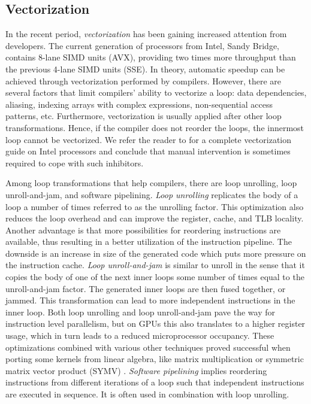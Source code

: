\subsection{Vectorization}

In the recent period, \textit{vectorization} has been gaining increased
attention from developers. The current generation of processors from Intel,
Sandy Bridge, contains 8-lane SIMD units (AVX), providing two times more
throughput than the previous 4-lane SIMD units (SSE). In theory, automatic
speedup can be achieved through vectorization performed by compilers. However,
there are several factors that limit compilers' ability to vectorize a loop: 
data dependencies, aliasing, indexing arrays with complex expressions,
non-sequential access patterns, etc. Furthermore, vectorization is usually
applied after other loop transformations. Hence, if the compiler does not
reorder the loops, the innermost loop cannot be vectorized. We refer the reader
to \cite{vec_guide} for a complete vectorization guide on Intel processors 
and conclude that manual intervention is sometimes required to cope with
such inhibitors.

Among loop transformations that help compilers, there are loop unrolling, loop
unroll-and-jam, and software pipelining. \textit{Loop unrolling} replicates the
body of a loop a number of times referred to as the unrolling factor. This
optimization also reduces the loop overhead and can improve the register, cache,
and TLB locality. Another advantage is that more possibilities for reordering
instructions are available, thus resulting in a better utilization of the
instruction pipeline. The downside is an increase in size of the generated code
which puts more pressure on the instruction cache. \textit{Loop unroll-and-jam}
is similar to unroll in the sense that it copies the body of one of the next
inner loops some number of times equal to the unroll-and-jam factor. The
generated inner loops are then fused together, or jammed. This transformation
can lead to more independent instructions in the inner loop. Both loop unrolling
and loop unroll-and-jam pave the way for instruction level parallelism, but on
GPUs this also translates to a higher register usage, which in turn leads to a
reduced microprocessor occupancy. These optimizations combined with various
other techniques proved successful when porting some kernels from linear
algebra, like matrix multiplication \cite{Volkov:2008:BGT:1413370.1413402} or
symmetric matrix vector product (SYMV) \cite{Nath:2011:OSD:2063384.2063392}.
\textit{Software pipelining} implies reordering instructions from different
iterations of a loop such that independent instructions are executed in
sequence. It is often used in combination with loop unrolling.

